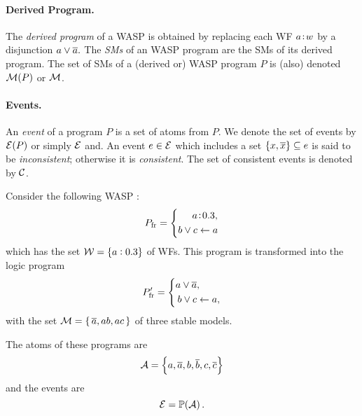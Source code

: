 \documentclass[x11names]{tlp}
\begin{document}
\paragraph{Derived Program.}

The \emph{derived program} of a \ac{WASP} is obtained by replacing each \acl{WF} $a\!:\!w$ by a disjunction $ a \vee \overline{a}. $ The \textit{\aclp{SM}} of an \acs{WASP} program are the \aclp{SM} of its derived program.
The set of \acp{SM} of a (derived or) \acs{WASP} program $P$ is (also) denoted~$\MODELset\at{P}$ or $\MODELset$.

\paragraph{Events.}

An \emph{event} of a program $P$ is a set of atoms from $P$.
We denote the set of events by
$\EVENTSset\at{P}$ or simply $\EVENTSset$ and.
An event $e \in \EVENTSset$ which includes a set $\set{x,
		\ensuremath{\overline{x}}} \subseteq e$ is said to be \textit{inconsistent}; otherwise it is \textit{consistent}.
The set of consistent events is denoted by $\CONSISTset$.

\begin{example}
	\label{ex:fruitful}\em

	Consider the following \acl{WASP} :
	\begin{equation}\label{eq:fruitful}
		\FRUITFUL = \left\{\begin{split}
			\weightfact{a & }{0.3},   %
			\\
			b \vee c    & \clause a
		\end{split}
		\right.
	\end{equation}
	which has the set $\WEIGHTFset = \{ a:0.3 \}$ of \aclp{WF}.
This program is transformed into the logic program
	\begin{equation}\label{eq:derived.fruitful}
		\FRUITFUL' = \left\{\begin{split}
			a \vee \co{a} & ,          %
			\\
			b \vee c      & \clause a,
		\end{split}
		\right.
	\end{equation}
	with the set
	$ \MODELset = \{\, \co{a}, ab, ac\, \} $
	of three stable models.

The atoms of these programs are 
\begin{equation}
	\ATOMSset = \set{a, \co{a}, b, \co{b}, c, \co{c}}
	\label{eq:atoms.fruitful}
\end{equation}
and the events are 
\begin{equation}
	\EVENTSset = \powerset{\ATOMSset}.
	\label{eq:fruitful.events}
\end{equation}
\end{example}
\end{document}
